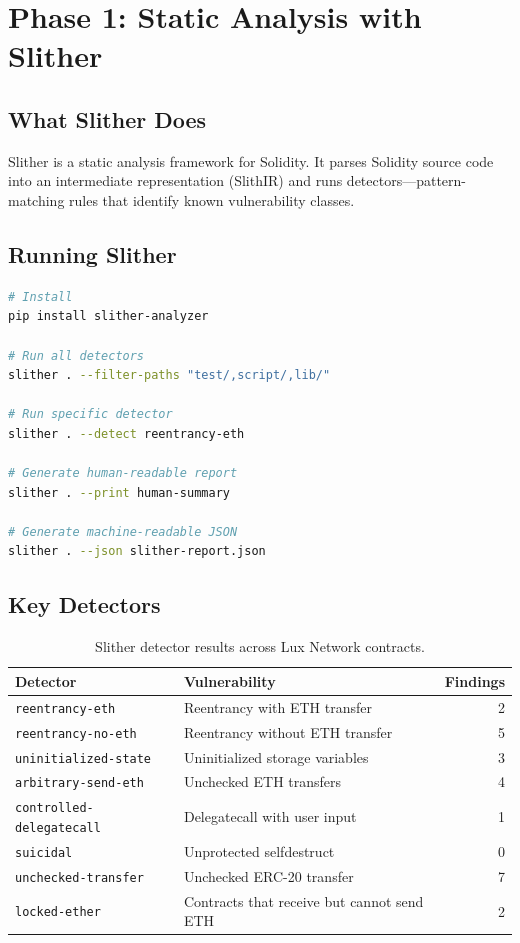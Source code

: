 \section{Phase 1: Static Analysis with Slither}


\subsection{What Slither Does}

Slither is a static analysis framework for Solidity. It parses Solidity source code into
an intermediate representation (SlithIR) and runs detectors---pattern-matching rules that
identify known vulnerability classes.

\subsection{Running Slither}

\begin{lstlisting}[language=bash,caption={Running Slither on a Foundry project}]
# Install
pip install slither-analyzer

# Run all detectors
slither . --filter-paths "test/,script/,lib/"

# Run specific detector
slither . --detect reentrancy-eth

# Generate human-readable report
slither . --print human-summary

# Generate machine-readable JSON
slither . --json slither-report.json
\end{lstlisting}

\subsection{Key Detectors}

\begin{table}[H]
\centering
\small
\begin{tabular}{@{}llr@{}}
\toprule
\textbf{Detector} & \textbf{Vulnerability} & \textbf{Findings} \\
\midrule
\texttt{reentrancy-eth} & Reentrancy with ETH transfer & 2 \\
\texttt{reentrancy-no-eth} & Reentrancy without ETH transfer & 5 \\
\texttt{uninitialized-state} & Uninitialized storage variables & 3 \\
\texttt{arbitrary-send-eth} & Unchecked ETH transfers & 4 \\
\texttt{controlled-delegatecall} & Delegatecall with user input & 1 \\
\texttt{suicidal} & Unprotected selfdestruct & 0 \\
\texttt{unchecked-transfer} & Unchecked ERC-20 transfer & 7 \\
\texttt{locked-ether} & Contracts that receive but cannot send ETH & 2 \\
\bottomrule
\end{tabular}
\caption{Slither detector results across Lux Network contracts.}
\end{table}

